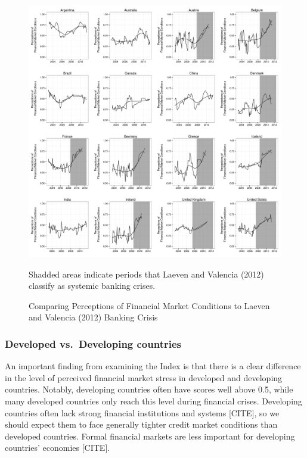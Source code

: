 \documentclass[]{article}
\begin{document}
\begin{figure}
    \caption{Comparing Perceptions of Financial Market Conditions to Laeven and Valencia (2012) Banking Crisis}
    \label{compare_1}
    \begin{center}
        \includegraphics[scale=0.4]{analysis/figures/compare_to_lv.pdf}
    \end{center}

    {\scriptsize{Shadded areas indicate periods that Laeven and Valencia (2012) classify as systemic banking crises.}}
\end{figure}

\subsubsection{Developed vs.~Developing
countries}\label{developed-vs.developing-countries}

An important finding from examining the Index is that there is a clear
difference in the level of perceived financial market stress in
developed and developing countries. Notably, developing countries often
have scores well above 0.5, while many developed countries only reach
this level during financial crises. Developing countries often lack
strong financial institutions and systems {[}CITE{]}, so we should
expect them to face generally tighter credit market conditions than
developed countries. Formal financial markets are less important for
developing countries' economies {[}CITE{]}.
\end{document}
